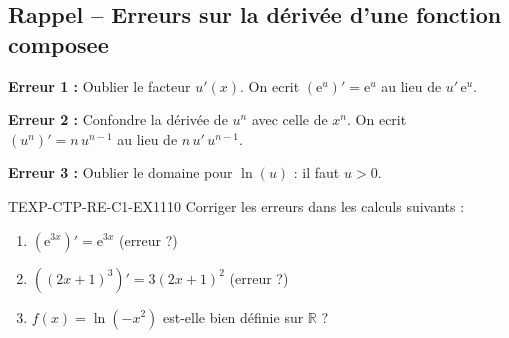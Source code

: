 

\subsection*{Rappel -- Erreurs sur la dérivée d'une fonction composee}

\textbf{Erreur 1 :} Oublier le facteur $u'(x)$. On ecrit $(\mathrm{e}^{u})' = \mathrm{e}^u$ au lieu de $u'\,\mathrm{e}^u$.

\textbf{Erreur 2 :} Confondre la dérivée de $u^n$ avec celle de $x^n$. On ecrit $(u^n)' = n\,u^{n-1}$ au lieu de $n\,u'\,u^{n-1}$.

\textbf{Erreur 3 :} Oublier le domaine pour $\ln(u)$ : il faut $u > 0$.

\begin{exercice}{TEXP-CTP-RE-C1-EX1}{1}{10}
Corriger les erreurs dans les calculs suivants :
\begin{enumerate}
  \item $\left(\mathrm{e}^{3x}\right)' = \mathrm{e}^{3x}$ \quad (erreur ?)
  \item $\left((2x+1)^3\right)' = 3(2x+1)^2$ \quad (erreur ?)
  \item $f(x) = \ln(-x^2)$ est-elle bien définie sur $\mathbb{R}$ ?
\end{enumerate}
\end{exercice}

